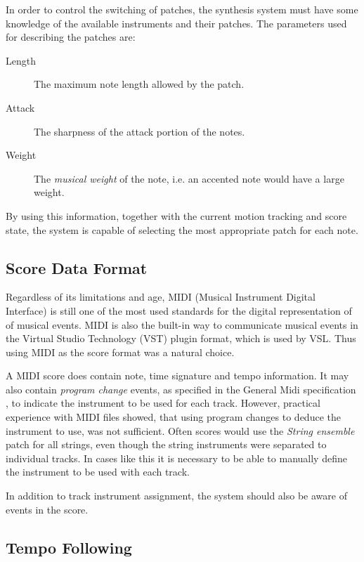 In order to control the switching of patches,
the synthesis system must have some knowledge of
the available instruments and their patches.
The parameters used for describing the patches are:
\begin{description}
\item[Length] The maximum note length allowed by the patch.
\item[Attack] The sharpness of the attack portion of the notes.
\item[Weight] The \textit{musical weight} of the note, i.e. an accented note would have a large weight.
\end{description}
By using this information,
together with the current motion tracking and score state,
the system is capable of selecting
the most appropriate patch for each note.


\subsection{Score Data Format}

Regardless of its limitations and age,
MIDI (Musical Instrument Digital Interface)
is still one of the most used standards
for the digital representation of of musical events.
MIDI is also the built-in way to communicate musical events
in the Virtual Studio Technology (VST) plugin format,
which is used by VSL.
Thus using MIDI as the score format was a natural choice.

A MIDI score does contain
note, time signature and tempo information.
It may also contain \textit{program change} events,
as specified in the General Midi specification \cite{},
to indicate the instrument to be used for each track.
However, practical experience with MIDI files showed,
that using program changes to deduce the instrument to use,
was not sufficient.
Often scores would use the
\textit{String ensemble} patch for all strings,
even though the string instruments were separated to individual tracks.
In cases like this it is necessary to be able to manually
define the instrument to be used with each track.

In addition to track instrument assignment,
the system should also be aware of events in the score.


\subsection{Tempo Following}


